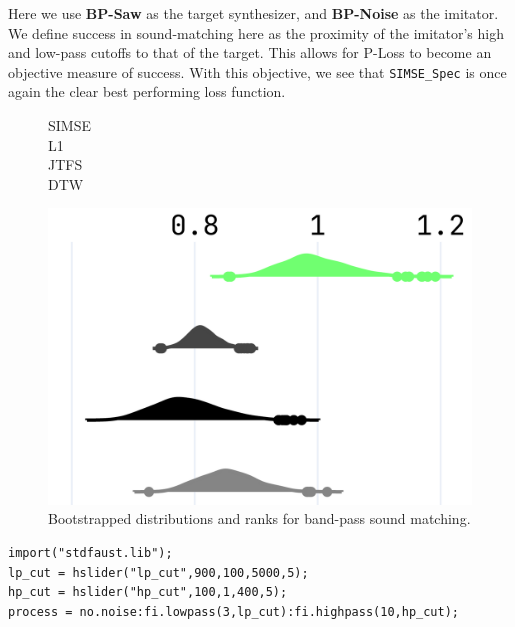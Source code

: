 \documentclass[runningheads]{llncs}
\newcommand{\SIMSESpec}{\texttt{SIMSE\_Spec}\xspace}
\newcommand{\BPNoise}{\textbf{BP-Noise}\xspace}
\newcommand{\BPSaw}{\textbf{BP-Saw}\xspace}
\begin{document}
 Here we use \BPSaw as the target synthesizer, and \BPNoise as the imitator. We define success in sound-matching here as the proximity of the imitator's high and low-pass cutoffs to that of the target. This allows for P-Loss to become an objective measure of success. With this objective, we see that \SIMSESpec is once again the clear best performing loss function.

\begin{figure}[htbp]
  \centering
  \scriptsize
  \begin{minipage}{\columnwidth}
    \begin{minipage}{0.10\columnwidth}
      \raggedleft
      \vspace{0.5cm}
      SIMSE\\[0.6cm]
      L1\\[0.65cm]
      JTFS\\[0.65cm]
      DTW
    \end{minipage}%
    \begin{minipage}{0.88\columnwidth}
      \centering
      \includegraphics[width=\linewidth]{images/npsk_ood_P_Loss_3.png}
    \end{minipage}
  \end{minipage}
  \caption{Bootstrapped distributions and ranks for band-pass sound matching.}
  \label{fig:npsk_BP}
\end{figure}



\begin{lstlisting}[caption={\BPNoise}, label={lst:program0}, language=Faust,
                  float, floatplacement=!H, xleftmargin=1em, xrightmargin=0.5em, firstnumber=0, aboveskip=0em, belowskip=-1em]
import("stdfaust.lib");
lp_cut = hslider("lp_cut",900,100,5000,5);
hp_cut = hslider("hp_cut",100,1,400,5);
process = no.noise:fi.lowpass(3,lp_cut):fi.highpass(10,hp_cut);
\end{lstlisting}
\end{document}
